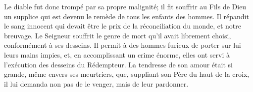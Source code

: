 Le diable fut donc trompé par sa propre malignité;
	il fit souffrir au Fils de Dieu un supplice
	qui est devenu le remède de tous les enfants des hommes.
Il répandit le sang innocent
	qui devait être le prix de la réconciliation du monde, et notre breuvage.
Le Seigneur souffrit le genre de mort qu’il avait librement choisi,
	conformément à ses desseins.
Il permit à des hommes furieux de porter sur lui leurs mains impies,
	et, en accomplissant un crime énorme,
	elles ont servi à l’exécution des desseins du Rédempteur.
La tendresse de son amour était si grande, même envers ses meurtriers,
	que, suppliant son Père du haut de la croix,
	il lui demanda non pas de le venger, mais de leur pardonner.
